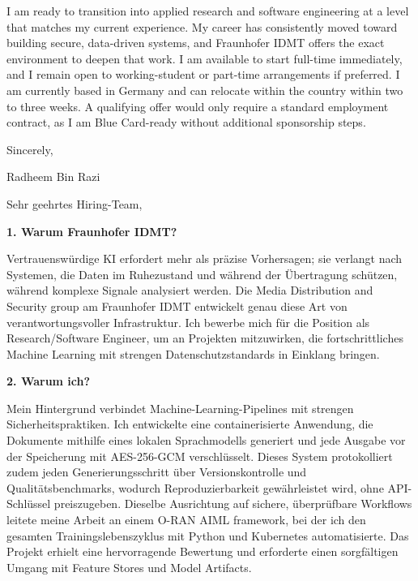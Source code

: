 \documentclass[11pt,a4paper]{coverletter}
\begin{document}
I am ready to transition into applied research and software engineering at a level that matches my current experience. My career has consistently moved toward building secure, data-driven systems, and Fraunhofer IDMT offers the exact environment to deepen that work. I am available to start full-time immediately, and I remain open to working-student or part-time arrangements if preferred. I am currently based in Germany and can relocate within the country within two to three weeks. A qualifying offer would only require a standard employment contract, as I am Blue Card-ready without additional sponsorship steps.

\closing{Sincerely,}{Radheem Bin Razi}

\clearpage
{}


\opening{Sehr geehrtes Hiring-Team,}

\vspace{8pt}\noindent\textbf{1. Warum Fraunhofer IDMT?}\par\vspace{3pt}

Vertrauenswürdige KI erfordert mehr als präzise Vorhersagen; sie verlangt nach Systemen, die Daten im Ruhezustand und während der Übertragung schützen, während komplexe Signale analysiert werden. Die Media Distribution and Security group am Fraunhofer IDMT entwickelt genau diese Art von verantwortungsvoller Infrastruktur. Ich bewerbe mich für die Position als Research/Software Engineer, um an Projekten mitzuwirken, die fortschrittliches Machine Learning mit strengen Datenschutzstandards in Einklang bringen.

\vspace{8pt}\noindent\textbf{2. Warum ich?}\par\vspace{3pt}

Mein Hintergrund verbindet Machine-Learning-Pipelines mit strengen Sicherheitspraktiken. Ich entwickelte eine containerisierte Anwendung, die Dokumente mithilfe eines lokalen Sprachmodells generiert und jede Ausgabe vor der Speicherung mit AES-256-GCM verschlüsselt. Dieses System protokolliert zudem jeden Generierungsschritt über Versionskontrolle und Qualitätsbenchmarks, wodurch Reproduzierbarkeit gewährleistet wird, ohne API-Schlüssel preiszugeben. Dieselbe Ausrichtung auf sichere, überprüfbare Workflows leitete meine Arbeit an einem O-RAN AIML framework, bei der ich den gesamten Trainingslebenszyklus mit Python und Kubernetes automatisierte. Das Projekt erhielt eine hervorragende Bewertung und erforderte einen sorgfältigen Umgang mit Feature Stores und Model Artifacts.
\end{document}
